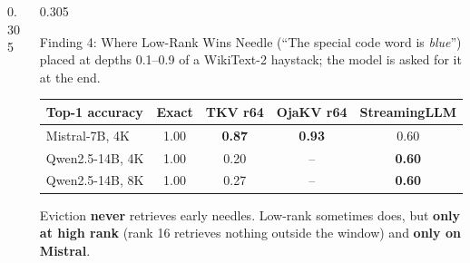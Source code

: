 \documentclass[final]{beamer}
\begin{document}
\begin{frame}[t]
\begin{columns}[t]
\begin{column}{0.305\paperwidth}
\end{column}

\begin{column}{0.305\paperwidth}

\begin{block}{Finding 4: Where Low-Rank Wins}
Needle (``The special code word is \emph{blue}'') placed at depths 0.1--0.9 of
a WikiText-2 haystack; the model is asked for it at the end.
\vspace{0.2cm}
\begin{center}
\end{center}
\begin{center}
\begin{tabular}{lcccc}
\toprule
Top-1 accuracy & Exact & TKV r64 & OjaKV r64 & StreamingLLM \\
\midrule
Mistral-7B, 4K  & 1.00 & \textbf{\color{accent}0.87} & \textbf{0.93} & 0.60 \\
Qwen2.5-14B, 4K & 1.00 & 0.20 & -- & \textbf{\color{teal}0.60} \\
Qwen2.5-14B, 8K & 1.00 & 0.27 & -- & \textbf{\color{teal}0.60} \\
\bottomrule
\end{tabular}
\end{center}
\vspace{0.2cm}
Eviction \textbf{never} retrieves early needles. Low-rank sometimes does, but
\textbf{only at high rank} (rank 16 retrieves nothing outside the window) and
\textbf{only on Mistral}.
\end{block}


\end{column}
\end{columns}
\end{frame}
\end{document}
